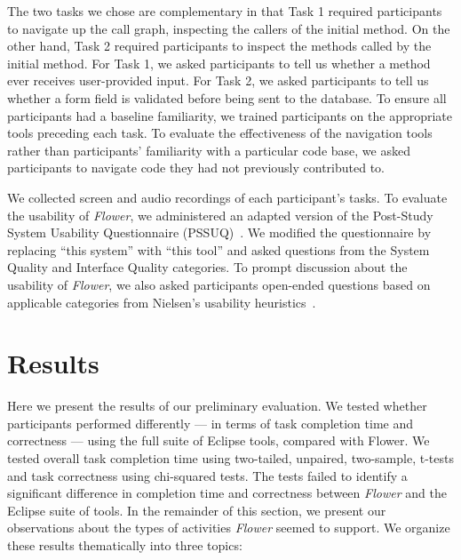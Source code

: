\documentclass[conference]{IEEEtran}
\begin{document}
The two tasks we chose are complementary in that Task 1 required participants to navigate up the call graph, inspecting the callers of the initial method. 
On the other hand, Task 2 required participants to inspect the methods called by the initial method.
For Task 1, we asked participants to tell us whether a method ever receives user-provided input.
For Task 2, we asked participants to tell us whether a form field is validated before being sent to the database.
To ensure all participants had a baseline familiarity, we trained participants on the appropriate tools preceding each task. 
To evaluate the effectiveness of the navigation tools rather than participants' familiarity with a particular code base, we asked participants to navigate code they had not previously contributed to. 

We collected screen and audio recordings of each participant's tasks.
To evaluate the usability of \textit{Flower}, we administered an adapted version of the Post-Study System Usability Questionnaire (PSSUQ)~\cite{Lewis95ibmcomputer}. We modified the questionnaire by replacing ``this system'' with ``this tool'' and asked questions from the System Quality and Interface Quality categories.
To prompt discussion about the usability of \textit{Flower}, we also asked participants open-ended questions based on applicable categories from Nielsen's usability heuristics~\cite{Nielsen1992}.


\section{Results}
Here we present the results of our preliminary evaluation. 
We tested whether participants performed differently --- in terms of task completion time and correctness --- using the full suite of Eclipse tools, compared with Flower. 
We tested overall task completion time using two-tailed, unpaired, two-sample, t-tests and task correctness using chi-squared tests. 
The tests failed to identify a significant difference in completion time and correctness between \textit{Flower} and the Eclipse suite of tools. 
In the remainder of this section, we present our observations about the types of activities \textit{Flower} seemed to support.
We organize these results thematically into three topics:
\end{document}
